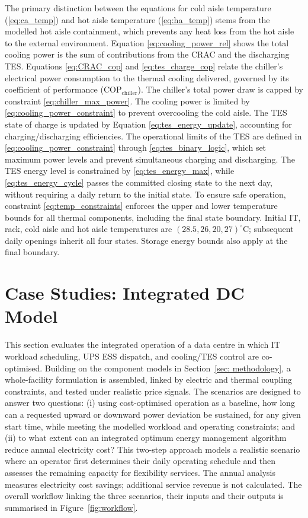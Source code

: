 \documentclass[lettersize,journal]{IEEEtran}
\begin{document}
The primary distinction between the equations for cold aisle temperature (\ref{eq:ca_temp}) and hot aisle temperature (\ref{eq:ha_temp}) stems from the modelled hot aisle containment, which prevents any heat loss from the hot aisle to the external environment. Equation \eqref{eq:cooling_power_rel} shows the total cooling power is the sum of contributions from the CRAC and the discharging TES. Equations \eqref{eq:CRAC_cop} and \eqref{eq:tes_charge_cop} relate the chiller's electrical power consumption to the thermal cooling delivered, governed by its coefficient of performance ($\mathrm{COP}_{\mathrm{chiller}}$). The chiller's total power draw is capped by constraint \eqref{eq:chiller_max_power}. The cooling power is limited by \eqref{eq:cooling_power_constraint} to prevent overcooling the cold aisle. The TES state of charge is updated by Equation \eqref{eq:tes_energy_update}, accounting for charging/discharging efficiencies. The operational limits of the TES are defined in \eqref{eq:cooling_power_constraint} through \eqref{eq:tes_binary_logic}, which set maximum power levels and prevent simultaneous charging and discharging. The TES energy level is constrained by \eqref{eq:tes_energy_max}, while \eqref{eq:tes_energy_cycle} passes the committed closing state to the next day, without requiring a daily return to the initial state.
To ensure safe operation, constraint \eqref{eq:temp_constraints} enforces the upper and lower temperature bounds for all thermal components, including the final state boundary. Initial IT, rack, cold aisle and hot aisle temperatures are $(28.5,26,20,27)^\circ$C; subsequent daily openings inherit all four states. Storage energy bounds also apply at the final boundary.
 

\section{Case Studies: Integrated DC Model}\label{sec:integrated_model and case studies}

This section evaluates the integrated operation of a data centre in which IT workload scheduling, UPS ESS dispatch, and cooling/TES control are co-optimised. Building on the component models in Section~\ref{sec: methodology}, a whole-facility formulation is assembled, linked by electric and thermal coupling constraints, and tested under realistic price signals. The scenarios are designed to answer two questions: (i) using cost-optimised operation as a baseline, how long can a requested upward or downward power deviation be sustained, for any given start time, while meeting the modelled workload and operating constraints; and (ii) to what extent can an integrated optimum energy management algorithm reduce annual electricity cost? This two-step approach models a realistic scenario where an operator first determines their daily operating schedule and then assesses the remaining capacity for flexibility services. The annual analysis measures electricity cost savings; additional service revenue is not calculated. The overall workflow linking the three scenarios, their inputs and their outputs is summarised in Figure~\ref{fig:workflow}.
\end{document}

